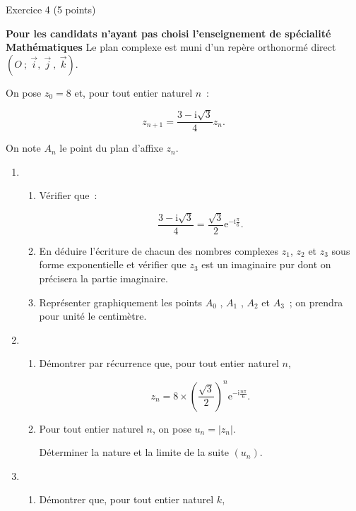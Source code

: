 
%
\begin{h2}Exercice 4 (5 points)\end{h2}
\textbf{Pour les candidats n'ayant pas choisi l'enseignement de spécialité \og Mathématiques \fg{} }
\bigbreak
Le plan complexe est muni d'un repère orthonormé direct $(O~;~\overrightarrow{i},~\overrightarrow{j}~,~\overrightarrow{k})$.
\par
On pose $z_0 = 8$ et, pour tout entier naturel $n$~:
\par
\[z_{n+1} = \dfrac{3 - \text{i}\sqrt{3}}{4}z_n.\]
\par
On note $A_n$ le point du plan d'affixe $z_n$.
\medbreak
\begin{enumerate}
     \item
     \begin{enumerate}[label=\alph*.]
          \item Vérifier que~:
          \par
          \[\dfrac{3 - \text{i}\sqrt{3}}{4} = \dfrac{\sqrt{3}}{2}\text{e}^{- \text{i}\frac{\pi}{6}}.\]
          \item En déduire l'écriture de chacun des nombres complexes $z_1$,  $z_2$ et $z_3$ sous forme exponentielle et vérifier que $z_3$ est un imaginaire pur dont on précisera la partie imaginaire.
          \item Représenter graphiquement les points $A_0$ , $A_1$ , $A_2$ et $A_3$~; on prendra pour unité le centimètre.
     \end{enumerate}
     \item
     \begin{enumerate}[label=\alph*.]
          \item Démontrer par récurrence que, pour tout entier naturel $n$,
          \par
          \[z_n = 8 \times \left(\dfrac{\sqrt{3}}{2}\right)^n \text{e}^{- \text{i}\frac{n\pi}{6}}.\]
          \item Pour tout entier naturel $n$, on pose $u_n = \left|z_n\right|$.
          \par
          Déterminer la nature et la limite de la suite $\left(u_n\right)$.
     \end{enumerate}
     \item
     \begin{enumerate}[label=\alph*.]
          \item Démontrer que, pour tout entier naturel $k$,

\end{enumerate}
\end{enumerate}
